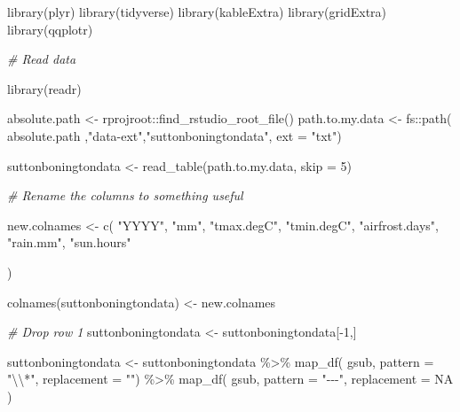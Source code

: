 \documentclass{article}
\newenvironment{Shaded}{\begin{snugshade}}{\end{snugshade}}
\newcommand{\AttributeTok}[1]{\textcolor[rgb]{0.77,0.63,0.00}{#1}}
\newcommand{\CommentTok}[1]{\textcolor[rgb]{0.56,0.35,0.01}{\textit{#1}}}
\newcommand{\ConstantTok}[1]{\textcolor[rgb]{0.00,0.00,0.00}{#1}}
\newcommand{\DecValTok}[1]{\textcolor[rgb]{0.00,0.00,0.81}{#1}}
\newcommand{\FunctionTok}[1]{\textcolor[rgb]{0.00,0.00,0.00}{#1}}
\newcommand{\NormalTok}[1]{#1}
\newcommand{\OtherTok}[1]{\textcolor[rgb]{0.56,0.35,0.01}{#1}}
\newcommand{\SpecialCharTok}[1]{\textcolor[rgb]{0.00,0.00,0.00}{#1}}
\newcommand{\StringTok}[1]{\textcolor[rgb]{0.31,0.60,0.02}{#1}}
\begin{document}
\begin{Shaded}
\begin{Highlighting}[]
\FunctionTok{library}\NormalTok{(plyr)}
\FunctionTok{library}\NormalTok{(tidyverse)}
\FunctionTok{library}\NormalTok{(kableExtra)}
\FunctionTok{library}\NormalTok{(gridExtra)}
\FunctionTok{library}\NormalTok{(qqplotr)}

\CommentTok{\# Read data}

\FunctionTok{library}\NormalTok{(readr)}

\NormalTok{absolute.path }\OtherTok{\textless{}{-}}\NormalTok{ rprojroot}\SpecialCharTok{::}\FunctionTok{find\_rstudio\_root\_file}\NormalTok{()}
\NormalTok{path.to.my.data }\OtherTok{\textless{}{-}}\NormalTok{ fs}\SpecialCharTok{::}\FunctionTok{path}\NormalTok{( absolute.path}
\NormalTok{                               ,}\StringTok{"data{-}ext"}\NormalTok{,}\StringTok{"suttonboningtondata"}\NormalTok{, }\AttributeTok{ext =} \StringTok{"txt"}\NormalTok{)}


\NormalTok{suttonboningtondata }\OtherTok{\textless{}{-}} \FunctionTok{read\_table}\NormalTok{(path.to.my.data, }
    \AttributeTok{skip =} \DecValTok{5}\NormalTok{)}

\CommentTok{\# Rename the columns to something useful}

\NormalTok{new.colnames }\OtherTok{\textless{}{-}} \FunctionTok{c}\NormalTok{( }\StringTok{"YYYY"}\NormalTok{,}
                   \StringTok{"mm"}\NormalTok{,}
                   \StringTok{"tmax.degC"}\NormalTok{,}
                   \StringTok{"tmin.degC"}\NormalTok{,}
                   \StringTok{"airfrost.days"}\NormalTok{,}
                   \StringTok{"rain.mm"}\NormalTok{,}
                   \StringTok{"sun.hours"}
  
\NormalTok{)}

\FunctionTok{colnames}\NormalTok{(suttonboningtondata) }\OtherTok{\textless{}{-}}\NormalTok{ new.colnames}

\CommentTok{\# Drop row 1}
\NormalTok{suttonboningtondata }\OtherTok{\textless{}{-}}\NormalTok{ suttonboningtondata[}\SpecialCharTok{{-}}\DecValTok{1}\NormalTok{,] }

\NormalTok{suttonboningtondata }\OtherTok{\textless{}{-}}\NormalTok{ suttonboningtondata }\SpecialCharTok{\%\textgreater{}\%}
                        \FunctionTok{map\_df}\NormalTok{( gsub,}
                                \AttributeTok{pattern =} \StringTok{"}\SpecialCharTok{\textbackslash{}\textbackslash{}}\StringTok{*"}\NormalTok{,}
                                \AttributeTok{replacement =} \StringTok{""}\NormalTok{) }\SpecialCharTok{\%\textgreater{}\%}
                        \FunctionTok{map\_df}\NormalTok{( gsub,}
                                \AttributeTok{pattern =} \StringTok{"{-}{-}{-}"}\NormalTok{,}
                                \AttributeTok{replacement =} \ConstantTok{NA}
\NormalTok{                                )}
  

\end{Highlighting}
\end{Shaded}
\end{document}
